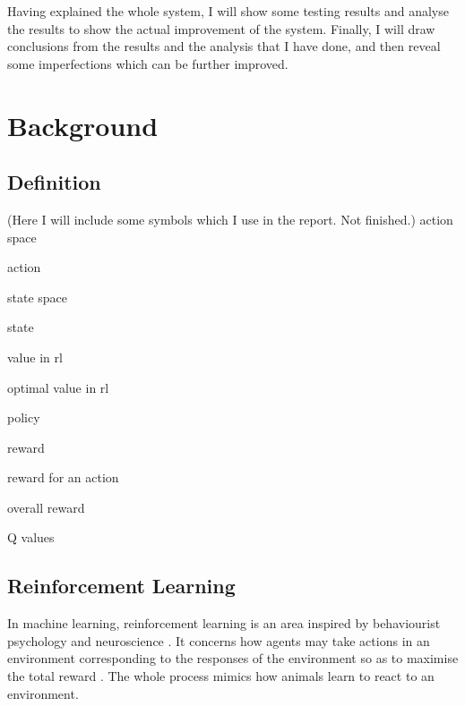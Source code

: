\documentclass[a4paper]{article}
\begin{document}
            Having explained the whole system, I will show some testing results and
            analyse the results to show the actual improvement of the system. Finally,
            I will draw conclusions from the results and the analysis that I have done,
            and then reveal some imperfections which can be further improved.





    \section{Background}
    
        \subsection{Definition}
        
        (Here I will include some symbols which I use in the report. Not finished.)
        action space
        
        action
        
        state space
        
        state
        
        value in rl
        
        optimal value in rl
        
        policy
        
        reward
        
        reward for an action
        
        overall reward
        
        Q values
        
        
        
        
        
        
        
        \subsection{Reinforcement Learning}
            In machine learning, reinforcement learning is an area
            inspired by behaviourist psychology \cite{thorndike1898animal}
            and neuroscience \cite{Schultz_1997}. It concerns how agents may take
            actions in an environment corresponding to the responses of
            the environment so as to maximise the total reward \cite{intro-rl}.
            The whole process mimics how animals learn to react to
            an environment.
            
\end{document}
